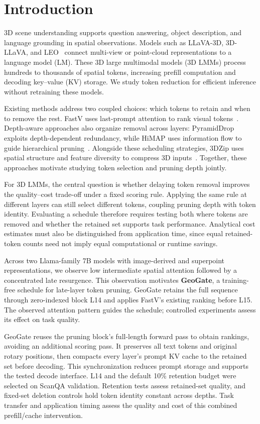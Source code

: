 \section{Introduction}
3D scene understanding supports question answering, object description, and language grounding in spatial observations. Models such as LLaVA-3D, 3D-LLaVA, and LEO~\cite{zhu2024llava3d,deng20253dllava,huang2024leo} connect multi-view or point-cloud representations to a language model (LM). These 3D large multimodal models (3D LMMs) process hundreds to thousands of spatial tokens, increasing prefill computation and decoding key--value (KV) storage. We study token reduction for efficient inference without retraining these models.

Existing methods address two coupled choices: which tokens to retain and when to remove the rest. FastV uses last-prompt attention to rank visual tokens~\cite{chen2024fastv}. Depth-aware approaches also organize removal across layers: PyramidDrop exploits depth-dependent redundancy, while HiMAP uses information flow to guide hierarchical pruning~\cite{yuan2024pyramiddrop,yin2025himap}. Alongside these scheduling strategies, 3DZip uses spatial structure and feature diversity to compress 3D inputs~\cite{baek2026zip}. Together, these approaches motivate studying token selection and pruning depth jointly.

For 3D LMMs, the central question is whether delaying token removal improves the quality--cost trade-off under a fixed scoring rule. Applying the same rule at different layers can still select different tokens, coupling pruning depth with token identity. Evaluating a schedule therefore requires testing both where tokens are removed and whether the retained set supports task performance. Analytical cost estimates must also be distinguished from application time, since equal retained-token counts need not imply equal computational or runtime savings.

Across two Llama-family 7B models with image-derived and superpoint representations, we observe low intermediate spatial attention followed by a concentrated late resurgence. This observation motivates \textbf{GeoGate}, a training-free schedule for late-layer token pruning. GeoGate retains the full sequence through zero-indexed block L14 and applies FastV's existing ranking before L15. The observed attention pattern guides the schedule; controlled experiments assess its effect on task quality.

GeoGate reuses the pruning block's full-length forward pass to obtain rankings, avoiding an additional scoring pass. It preserves all text tokens and original rotary positions, then compacts every layer's prompt KV cache to the retained set before decoding. This synchronization reduces prompt storage and supports the tested decode interface. L14 and the default 10\% retention budget were selected on ScanQA validation. Retention tests assess retained-set quality, and fixed-set deletion controls hold token identity constant across depths. Task transfer and application timing assess the quality and cost of this combined prefill/cache intervention.

